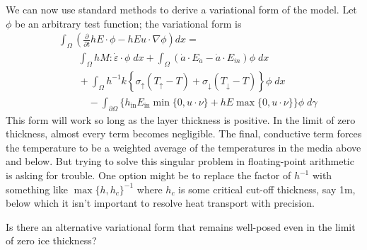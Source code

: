 \documentclass{article}
\theoremstyle{definition}
\theoremstyle{plain}
\begin{document}
We can now use standard methods to derive a variational form of the model.
Let $\phi$ be an arbitrary test function; the variational form is
\begin{align}
    & \int_\Omega \left(\frac{\partial}{\partial t}hE\cdot\phi - hEu\cdot\nabla\phi\right)dx = \nonumber\\
    & \qquad \int_\Omega h M:\dot\varepsilon\cdot\phi\;dx + \int_\Omega\left(\dot a\cdot E_{\dot a} - \dot a\cdot E_{\dot m}\right)\phi\;dx \nonumber\\
    & \qquad + \int_\Omega h^{-1}k\left\{\sigma_{\uparrow}(T_{\uparrow} - T) + \sigma_{\downarrow}(T_{\downarrow} - T)\right\}\phi\;dx \nonumber\\
    & \quad\qquad - \int_{\partial\Omega}\Big\{h_{\text{in}}E_{\text{in}}\min\{0, u\cdot\nu\} + hE\max\{0, u\cdot\nu\}\Big\}\phi\;d\gamma
\end{align}
This form will work so long as the layer thickness is positive.
In the limit of zero thickness, almost every term becomes negligible.
The final, conductive term forces the temperature to be a weighted average of the temperatures in the media above and below.
But trying to solve this singular problem in floating-point arithmetic is asking for trouble.
One option might be to replace the factor of $h^{-1}$ with something like $\max\{h, h_c\}^{-1}$ where $h_c$ is some critical cut-off thickness, say 1m, below which it isn't important to resolve heat transport with precision.

Is there an alternative variational form that remains well-posed even in the limit of zero ice thickness?


\pagebreak



\end{document}
